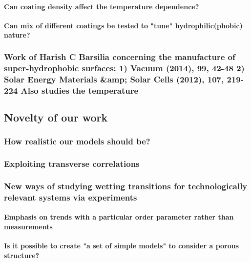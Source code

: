 \documentclass[a4paper,12pt,single,pdftex]{scrartcl}
\begin{document}
{\label{ID_838488932}\paragraph{Can coating density affect the temperature dependence?}

\label{ID_1401479645}\paragraph{Can mix of different coatings be tested to "tune" hydrophilic(phobic) nature?}

\label{ID_1523203023}\subsubsection{Work of Harish C Barsilia concerning the manufacture of super-hydrophobic surfaces: 1) Vacuum (2014), 99, 42-48 2) Solar Energy Materials &amp; Solar Cells (2012), 107, 219-224 Also studies the temperature}

\label{ID_1979164963}\subsection{Novelty of our work}

\label{ID_1997632539}\subsubsection{How realistic our models should be?}

\label{ID_625214648}\subsubsection{Exploiting transverse correlations}

\label{ID_1607535616}\subsubsection{New ways of studying wetting transitions for technologically relevant systems via experiments}

\label{ID_825518109}\paragraph{Emphasis on trends with a particular order parameter rather than measurements}

\label{ID_1028951925}\paragraph{Is it possible to create "a set of simple models" to consider a porous structure?}

}
\end{document}
